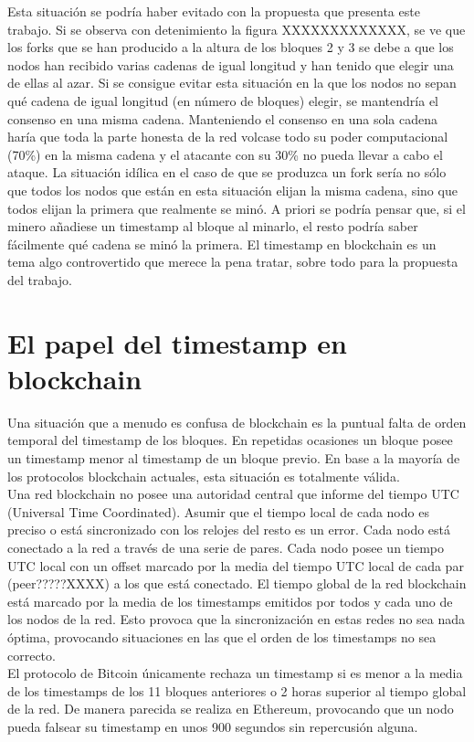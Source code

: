 Esta situación se podría haber evitado con la propuesta que presenta este trabajo. Si se observa con detenimiento la figura XXXXXXXXXXXXX, se ve que los forks que se han producido a la altura de los bloques 2 y 3 se debe a que los nodos han recibido varias cadenas de igual longitud y han tenido que elegir una de ellas al azar. Si se consigue evitar esta situación en la que los nodos no sepan qué cadena de igual longitud (en número de bloques) elegir, se mantendría el consenso en una misma cadena. Manteniendo el consenso en una sola cadena haría que toda la parte honesta de la red volcase todo su poder computacional (70\%) en la misma cadena y el atacante con su 30\% no pueda llevar a cabo el ataque.
La situación idílica en el caso de que se produzca un fork sería no sólo que todos los nodos que están en esta situación elijan la misma cadena, sino que todos elijan la primera que realmente se minó. A priori se podría pensar que, si el minero añadiese un timestamp al bloque al minarlo, el resto podría saber fácilmente qué cadena se minó la primera. El timestamp en blockchain es un tema algo controvertido que merece la pena tratar, sobre todo para la propuesta del trabajo.

\section{El papel del timestamp en blockchain}
Una situación que a menudo es confusa de blockchain es la puntual falta de orden temporal del timestamp de los bloques. En repetidas ocasiones un bloque posee un timestamp menor al timestamp de un bloque previo. En base a la mayoría de los protocolos blockchain actuales, esta situación es totalmente válida. \\
Una red blockchain no posee una autoridad central que informe del tiempo UTC (Universal Time Coordinated). Asumir que el tiempo local de cada nodo es preciso o está sincronizado con los relojes del resto es un error. Cada nodo está conectado a la red a través de una serie de pares. Cada nodo posee un tiempo UTC local con un offset marcado por la media del tiempo UTC local de cada par (peer?????XXXX) a los que está conectado. El tiempo global de la red blockchain está marcado por la media de los timestamps emitidos por todos y cada uno de los nodos de la red. Esto provoca que la sincronización en estas redes no sea nada óptima, provocando situaciones en las que el orden de los timestamps no sea correcto. \\
El protocolo de Bitcoin únicamente rechaza un timestamp si es menor a la media de los timestamps de los 11 bloques anteriores o 2 horas superior al tiempo global de la red. De manera parecida se realiza en Ethereum, provocando que un nodo pueda falsear su timestamp en unos 900 segundos sin repercusión alguna.

